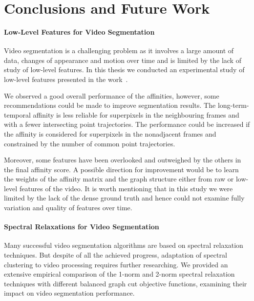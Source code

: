 \chapter{Conclusions and Future Work}
\label{Chapter6}
\subsubsection*{Low-Level Features for Video Segmentation}
Video segmentation is a challenging problem as it involves a large amount of data, changes of appearance and motion over time and is limited by the lack of study of low-level features.
In this thesis we conducted an experimental study of low-level features presented in the work~\cite{GalassoCS12}. 

We observed a good overall performance of the affinities, however, some   
recommendations could be made to improve segmentation results. The long-term-temporal affinity is less reliable for superpixels in the neighbouring frames and with a fewer intersecting point trajectories.
The performance could be increased if the affinity is considered for superpixels in the nonadjacent frames and constrained by the number of common point trajectories.

Moreover, some features have been overlooked and outweighed by the others in the final affinity score. 
A possible direction for improvement would be to learn the weights of the affinity matrix and the graph structure either from raw or low-level features of the video. 
It is worth mentioning that in this study we were limited by the lack of the dense ground truth
and hence could not examine fully variation and quality of features over time.
\subsubsection*{Spectral Relaxations for Video Segmentation}
Many successful video segmentation algorithms are based on spectral relaxation techniques. 
But despite of all the achieved progress, adaptation of spectral clustering to video processing requires further researching.
We provided an extensive empirical comparison of the 1-norm and 2-norm spectral relaxation techniques with different balanced graph cut objective functions, examining their impact on video segmentation performance.

